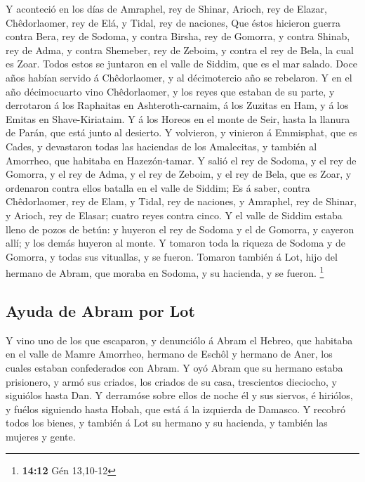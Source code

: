  Y aconteció en los días de Amraphel, rey de Shinar,
Arioch, rey de Elazar, Chêdorlaomer, rey de Elá, y Tidal, rey de
naciones,  Que éstos hicieron guerra contra Bera, rey de
Sodoma, y contra Birsha, rey de Gomorra, y contra Shinab, rey de Adma, y
contra Shemeber, rey de Zeboim, y contra el rey de Bela, la cual es
Zoar.  Todos estos se juntaron en el valle de Siddim, que
es el mar salado.  Doce años habían servido á
Chêdorlaomer, y al décimotercio año se rebelaron.  Y en el
año décimocuarto vino Chêdorlaomer, y los reyes que estaban de su parte,
y derrotaron á los Raphaitas en Ashteroth-carnaim, á los Zuzitas en Ham,
y á los Emitas en Shave-Kiriataim.  Y á los Horeos en el
monte de Seir, hasta la llanura de Parán, que está junto al desierto.
 Y volvieron, y vinieron á Emmisphat, que es Cades, y
devastaron todas las haciendas de los Amalecitas, y también al Amorrheo,
que habitaba en Hazezón-tamar.  Y salió el rey de Sodoma,
y el rey de Gomorra, y el rey de Adma, y el rey de Zeboim, y el rey de
Bela, que es Zoar, y ordenaron contra ellos batalla en el valle de
Siddim;  Es á saber, contra Chêdorlaomer, rey de Elam, y
Tidal, rey de naciones, y Amraphel, rey de Shinar, y Arioch, rey de
Elasar; cuatro reyes contra cinco.  Y el valle de Siddim
estaba lleno de pozos de betún: y huyeron el rey de Sodoma y el de
Gomorra, y cayeron allí; y los demás huyeron al monte.  Y
tomaron toda la riqueza de Sodoma y de Gomorra, y todas sus vituallas, y
se fueron.  Tomaron también á Lot, hijo del hermano de
Abram, que moraba en Sodoma, y su hacienda, y se fueron. \footnote{\textbf{14:12}
  Gén 13,10-12}

\hypertarget{ayuda-de-abram-por-lot}{%
\subsection{Ayuda de Abram por Lot}\label{ayuda-de-abram-por-lot}}

 Y vino uno de los que escaparon, y denunciólo á Abram el
Hebreo, que habitaba en el valle de Mamre Amorrheo, hermano de Eschôl y
hermano de Aner, los cuales estaban confederados con Abram.
 Y oyó Abram que su hermano estaba prisionero, y armó sus
criados, los criados de su casa, trescientos dieciocho, y siguiólos
hasta Dan.  Y derramóse sobre ellos de noche él y sus
siervos, é hiriólos, y fuélos siguiendo hasta Hobah, que está á la
izquierda de Damasco.  Y recobró todos los bienes, y
también á Lot su hermano y su hacienda, y también las mujeres y gente.


